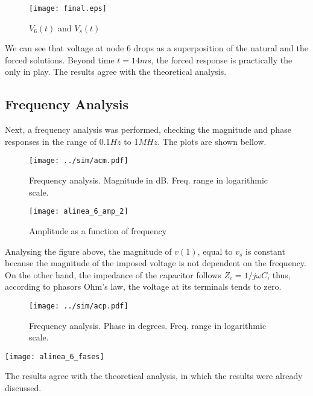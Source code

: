 
\begin{figure}[H]
  \centering
  \texttt{[image: final.eps]}
  \caption{$V_6(t)$ and $V_s(t)$}
  \label{fig:OctaveFinalSolution}
\end{figure}



\par We can see that voltage at node 6 drops as a superposition of the natural and the forced solutions. Beyond time $t=14ms$, the forced response is practically the only in play. The results agree with the theoretical analysis.
\pagebreak
\subsection{Frequency Analysis}

\par Next, a frequency analysis was performed, checking the magnitude and phase responses in the range of 0.1$Hz$ to 1$MHz$. The plots are shown bellow.


\begin{figure}[H]
  \centering
  \texttt{[image: ../sim/acm.pdf]}
  \caption{Frequency analysis. Magnitude in dB. Freq. range in logarithmic scale.}
  \label{fig:sim_3}
\end{figure}


\begin{figure}[H]
  \centering
  \texttt{[image: alinea\_6\_amp\_2]}
  \caption{Amplitude as a function of frequency}
  \label{fig:fignodos_2}
\end{figure}


\par Analysing the figure above, the magnitude of $v(1)$, equal to $v_s$ is constant because the magnitude of the imposed voltage is not dependent on the frequency. On the other hand, the impedance of the capacitor follows $Z_c = 1/j\omega C$, thus, according to phasors Ohm's law, the voltage at its terminals tends to zero. 


\begin{figure}[H]
  \centering
  \texttt{[image: ../sim/acp.pdf]}
  \caption{Frequency analysis. Phase in degrees. Freq. range in logarithmic scale.}
  \label{fig:sim_3}
\end{figure}

\begin{center}
    \texttt{[image: alinea\_6\_fases]}
     \label{fig:amp(f)1_2}
\end{center}

\par The results agree with the theoretical analysis, in which the results were already discussed.




